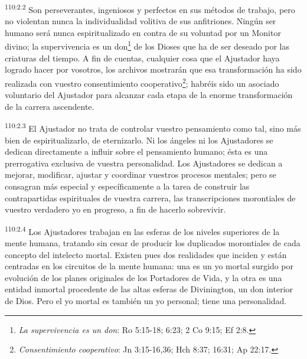 \par
\textsuperscript{110:2.2} Son perseverantes, ingeniosos y perfectos en sus métodos de trabajo, pero no violentan nunca la individualidad volitiva de sus anfitriones. Ningún ser humano será nunca espiritualizado en contra de su voluntad por un Monitor divino; la supervivencia es un don\footnote{\textit{La supervivencia es un don}: Ro 5:15-18; 6:23; 2 Co 9:15; Ef 2:8.} de los Dioses que ha de ser deseado por las criaturas del tiempo. A fin de cuentas, cualquier cosa que el Ajustador haya logrado hacer por vosotros, los archivos mostrarán que esa transformación ha sido realizada con vuestro consentimiento cooperativo\footnote{\textit{Consentimiento cooperativo}: Jn 3:15-16,36; Hch 8:37; 16:31; Ap 22:17.}; habréis sido un asociado voluntario del Ajustador para alcanzar cada etapa de la enorme transformación de la carrera ascendente.

\par
\textsuperscript{110:2.3} El Ajustador no trata de controlar vuestro pensamiento como tal, sino más bien de espiritualizarlo, de eternizarlo. Ni los ángeles ni los Ajustadores se dedican directamente a influir sobre el pensamiento humano; ésta es una prerrogativa exclusiva de vuestra personalidad. Los Ajustadores se dedican a mejorar, modificar, ajustar y coordinar vuestros procesos mentales; pero se consagran más especial y específicamente a la tarea de construir las contrapartidas espirituales de vuestra carrera, las transcripciones morontiales de vuestro verdadero yo en progreso, a fin de hacerlo sobrevivir.

\par
\textsuperscript{110:2.4} Los Ajustadores trabajan en las esferas de los niveles superiores de la mente humana, tratando sin cesar de producir los duplicados morontiales de cada concepto del intelecto mortal. Existen pues dos realidades que inciden y están centradas en los circuitos de la mente humana: una es un yo mortal surgido por evolución de los planes originales de los Portadores de Vida, y la otra es una entidad inmortal procedente de las altas esferas de Divinington, un don interior de Dios. Pero el yo mortal es también un yo personal; tiene una personalidad.

